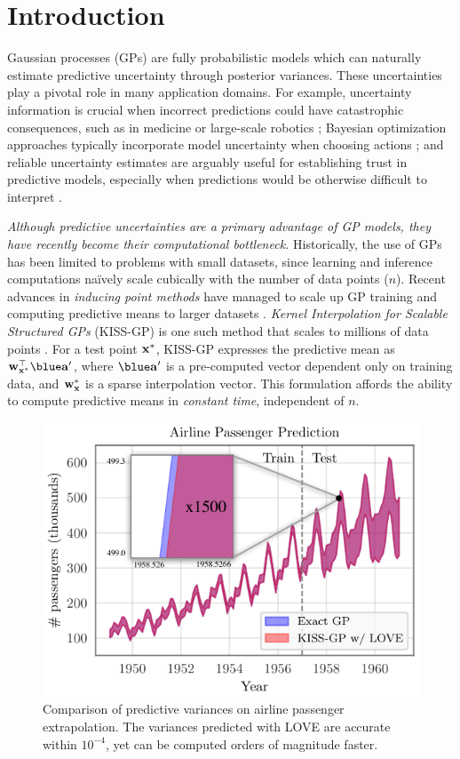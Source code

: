 \section{Introduction}
Gaussian processes (GPs) are fully probabilistic models which can naturally estimate predictive uncertainty through posterior variances.
These uncertainties play a pivotal role in many application domains.
For example, uncertainty information is crucial when incorrect predictions could have catastrophic consequences, such as in medicine \cite{schulam2017if} or large-scale robotics \cite{deisenroth2015gaussian};
Bayesian optimization approaches typically incorporate model uncertainty when choosing actions \cite{snoek2012practical,deisenroth2011pilco,wang2017max};
and reliable uncertainty estimates are arguably useful for establishing trust in predictive models,
especially when predictions would be otherwise difficult to interpret
\cite{doshi2017roadmap,zhou2017effects}.

\emph{Although predictive uncertainties are a primary advantage of GP models, they have recently become their computational bottleneck.}
Historically, the use of GPs has been limited to problems with small datasets, since learning and inference computations na\"ively scale cubically with the number of data points ($n$).
Recent advances in \emph{inducing point methods} have managed to scale up GP training and computing predictive means to larger datasets \cite{snelson2006sparse,quinonero2005unifying,titsias2009variational}.
\emph{Kernel Interpolation for Scalable Structured GPs} (KISS-GP) is one such method that scales to millions of data points \cite{wilson2015kernel,wilson2015thoughts}.
For a test point $\mathbf{x}^*$, KISS-GP expresses the predictive mean as $\bw_{\bxtest}^\top {\blue \ba'}$, where $\blue \ba'$ is a pre-computed vector dependent only on training data, and $\bw_\bxtest$ is a sparse interpolation vector.
This formulation affords the ability to compute predictive means in \emph{constant time}, independent of $n$.

\begin{figure}[t!]
  \centering
  \includegraphics[width=0.8\columnwidth]{figures/airline_comparison.pdf}
  \caption{
    Comparison of predictive variances on airline passenger extrapolation.
    The variances predicted with LOVE{} are accurate within $10^{-4}$, yet can be computed orders of magnitude faster.
    \label{fig:airline_results}
  }
\end{figure}

